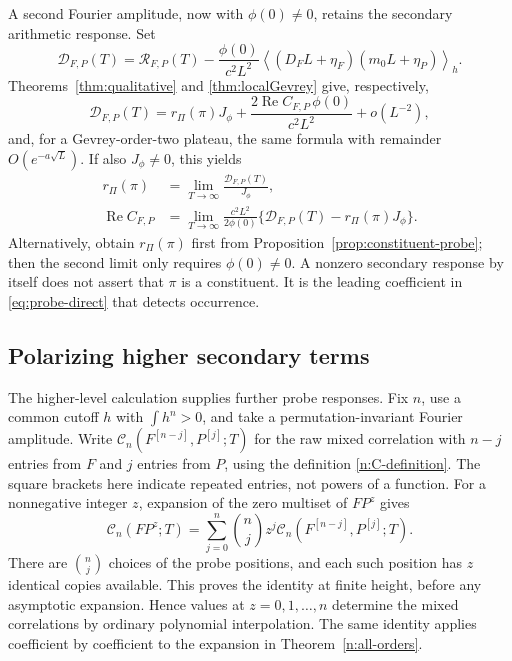 \documentclass[11pt]{article}
\numberwithin{equation}{section}
\theoremstyle{remark}
\newcommand{\Rea}{\operatorname{Re}}
\newcommand{\av}[1]{\left\langle #1\right\rangle_h}
\begin{document}
A second Fourier amplitude, now with $\phi(0)\ne0$, retains the
secondary arithmetic response.  Set
\begin{equation}\label{eq:denssub}
 \mathcal D_{F,P}(T)=\mathcal R_{F,P}(T)
 -\frac{\phi(0)}{c^2L^2}
       \av{(D_FL+\eta_F)(m_0L+\eta_P)}.
\end{equation}
Theorems~\ref{thm:qualitative} and \ref{thm:localGevrey} give,
respectively,
\begin{equation}\label{eq:detect}
 \mathcal D_{F,P}(T)=r_\Pi(\pi)J_\phi
       +\frac{2\Rea C_{F,P}\,\phi(0)}{c^2L^2}+o(L^{-2}),
\end{equation}
and, for a Gevrey-order-two plateau, the same formula with remainder
$O(e^{-a\sqrt L})$.  If also $J_\phi\ne0$, this yields
\begin{align}
 r_\Pi(\pi)&=\lim_{T\to\infty}
                  \frac{\mathcal D_{F,P}(T)}{J_\phi},
                  \label{eq:multlimit}\\
 \Rea C_{F,P}&=\lim_{T\to\infty}\frac{c^2L^2}{2\phi(0)}
       \{\mathcal D_{F,P}(T)-r_\Pi(\pi)J_\phi\}.
                  \label{eq:Climit}
\end{align}
Alternatively, obtain $r_\Pi(\pi)$ first from
Proposition~\ref{prop:constituent-probe}; then the second limit only
requires $\phi(0)\ne0$.  A nonzero secondary response by itself does not
assert that $\pi$ is a constituent.  It is the leading coefficient in
\eqref{eq:probe-direct} that detects occurrence.

\subsection{Polarizing higher secondary terms}

The higher-level calculation supplies further probe responses.  Fix
$n$, use a common cutoff $h$ with $\int h^n>0$, and take a
permutation-invariant Fourier amplitude.  Write
$\mathcal C_n(F^{[n-j]},P^{[j]};T)$ for the raw mixed correlation with
$n-j$ entries from $F$ and $j$ entries from $P$, using the definition
\eqref{n:C-definition}.  The square brackets here indicate repeated
entries, not powers of a function.  For a nonnegative integer $z$,
expansion of the zero multiset of $FP^z$ gives
\begin{equation}\label{eq:probe-polarization}
 \mathcal C_n(FP^z;T)
 =\sum_{j=0}^n\binom nj z^j
      \mathcal C_n(F^{[n-j]},P^{[j]};T).
\end{equation}
There are $\binom nj$ choices of the probe positions, and each such
position has $z$ identical copies available.  This proves the identity
at finite height, before any asymptotic expansion.  Hence values at
$z=0,1,\ldots,n$ determine the mixed correlations by ordinary polynomial
interpolation.  The same identity applies coefficient by coefficient
to the expansion in Theorem~\ref{n:all-orders}.
\end{document}
